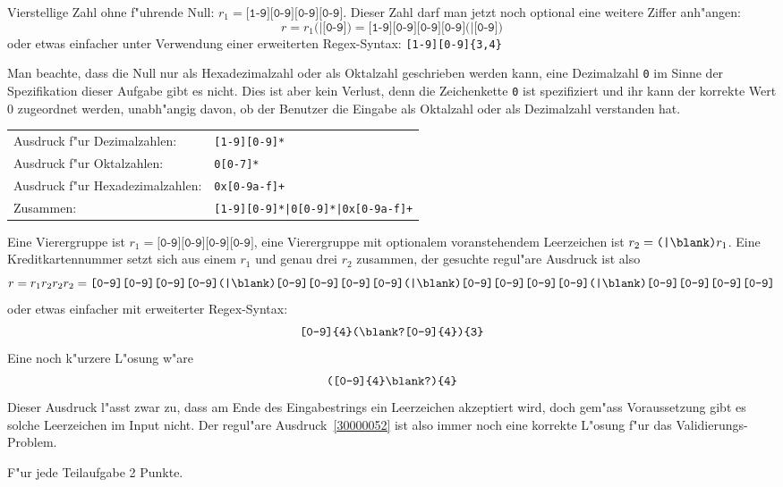 \begin{loesung}
\begin{teilaufgaben}
\item 
Vierstellige Zahl ohne f"uhrende Null:
$r_1 = \texttt{[1-9][0-9][0-9][0-9]}$.
Dieser Zahl darf man jetzt noch optional eine weitere Ziffer anh"angen:
\[
r=r_1\texttt{(|[0-9])}
=
\texttt{[1-9][0-9][0-9][0-9](|[0-9])}
\]
oder etwas einfacher unter Verwendung einer erweiterten Regex-Syntax:
\texttt{[1-9][0-9]\{3,4\}}
\item
Man beachte, dass die Null nur als Hexadezimalzahl oder als Oktalzahl
geschrieben werden kann, eine Dezimalzahl \texttt{0} im Sinne der Spezifikation
dieser Aufgabe gibt es nicht.
Dies ist aber kein Verlust, denn die Zeichenkette \texttt{0} ist spezifiziert
und ihr kann der korrekte Wert $0$ zugeordnet werden, unabh"angig davon, ob
der Benutzer die Eingabe als Oktalzahl oder als Dezimalzahl verstanden hat.
\begin{center}
\begin{tabular}{ll}
Ausdruck f"ur Dezimalzahlen:&\texttt{[1-9][0-9]*}\\
Ausdruck f"ur Oktalzahlen:&\texttt{0[0-7]*}\\
Ausdruck f"ur Hexadezimalzahlen:&\texttt{0x[0-9a-f]+}\\
Zusammen:&\texttt{[1-9][0-9]*|0[0-9]*|0x[0-9a-f]+}
\end{tabular}
\end{center}
\item
Eine Vierergruppe ist $r_1 = \texttt{[0-9][0-9][0-9][0-9]}$,
eine Vierergruppe mit optionalem voranstehendem Leerzeichen ist
$r_2 = \texttt{(|\blank)}r_1$.
Eine Kreditkartennummer setzt sich aus einem $r_1$ und genau drei
$r_2$ zusammen, der gesuchte regul"are Ausdruck ist also
\[
r = r_1r_2r_2r_2 = 
\texttt{[0-9][0-9][0-9][0-9]%
(|\blank)[0-9][0-9][0-9][0-9]%
(|\blank)[0-9][0-9][0-9][0-9]%
(|\blank)[0-9][0-9][0-9][0-9]}
\]
oder etwas einfacher mit erweiterter Regex-Syntax:
\[
\texttt{[0-9]\{4\}(\blank?[0-9]\{4\})\{3\}}
\]
Eine noch k"urzere L"osung w"are
\begin{equation}
\texttt{([0-9]\{4\}\blank?)\{4\}}
\label{30000052}
\end{equation}
Dieser Ausdruck l"asst zwar zu, dass am Ende des Eingabestrings ein
Leerzeichen akzeptiert wird, doch gem"ass Voraussetzung gibt es solche
Leerzeichen im Input nicht.
Der regul"are Ausdruck~\eqref{30000052} ist also immer noch eine korrekte 
L"osung f"ur das Validierungs-Problem.
\end{teilaufgaben}
\end{loesung}

\begin{bewertung}
F"ur jede Teilaufgabe 2 Punkte.
\end{bewertung}

